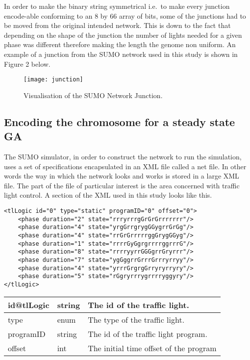 \documentclass[a4paper,10pt]{article}
\begin{document}
In order to make the binary string symmetrical i.e.\ to make every junction encode-able conforming to an 8 by 66 array of bits, some of 
the junctions had to be moved from the original intended network. This is down to the fact that depending on the shape of the junction 
the number of lights needed for a given phase was different therefore making the length the genome non uniform. An example of a junction 
from the SUMO network used in this study is shown in Figure 2 below.
\newline
\begin{figure}[h!]
  \caption{Visualisation of the SUMO Network Junction.}
  \centering
    \texttt{[image: junction]}
\end{figure}
\newline
\subsection{Encoding the chromosome for a steady state GA}
The SUMO simulator, in order to construct the network to run the simulation, uses a set of specifications encapsulated in an XML file 
called a net file. In other words the way in which the network looks and works is stored in a large XML file. The part of the file of 
particular interest is the area concerned with traffic light control.  A section of the XML used in this study looks like this.
\newline
\newline
\newline
\newline
\newline
\newline
\begin{lstlisting}
<tlLogic id="0" type="static" programID="0" offset="0">
    <phase duration="2" state="rrryrrrgGrGrGrrrrrrr"/>
    <phase duration="4" state="yrgGrrgrygGGygrrGrGg"/>
    <phase duration="4" state="rrGrGrrrrrggGrygGGyg"/>
    <phase duration="1" state="rrrrGyGgrgrrrrggrrrG"/>
    <phase duration="8" state="rrrryyrrGGGgrrGryrrr"/>
    <phase duration="7" state="ygGggrrGrrrGrrryrryy"/>
    <phase duration="4" state="yrrrGrgrgGrryryrryry"/>
    <phase duration="5" state="rGgryrrrygrrrryggyry"/>
</tlLogic>
\end{lstlisting}

\begin{center}
    \begin{tabular}{| l | l | p{10cm} |}
    \hline
    id@tlLogic & string & The id of the traffic light. \\ \hline
    type & enum & The type of the traffic light. \\ \hline
    programID & string & The id of the traffic light program. \\ \hline
    offset & int & The initial time offset of the program \\ \hline
    \end{tabular}
\end{center}
\end{document}
